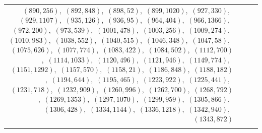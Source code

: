 \documentclass[11pt]{article}
\begin{document}
\begin{longtable}{@{}rrl>{\raggedright\arraybackslash}p{}@{}}
$(890,256)$,\allowbreak\ $(892,848)$,\allowbreak\ $(898,52)$,\allowbreak\ $(899,1020)$,\allowbreak\ $(927,330)$,\allowbreak\ $(929,1107)$,\allowbreak\ $(935,126)$,\allowbreak\ $(936,95)$,\allowbreak\ $(964,404)$,\allowbreak\ $(966,1366)$,\allowbreak\ $(972,200)$,\allowbreak\ $(973,539)$,\allowbreak\ $(1001,478)$,\allowbreak\ $(1003,256)$,\allowbreak\ $(1009,274)$,\allowbreak\ $(1010,983)$,\allowbreak\ $(1038,552)$,\allowbreak\ $(1040,515)$,\allowbreak\ $(1046,348)$,\allowbreak\ $(1047,58)$,\allowbreak\ $(1075,626)$,\allowbreak\ $(1077,774)$,\allowbreak\ $(1083,422)$,\allowbreak\ $(1084,502)$,\allowbreak\ $(1112,700)$,\allowbreak\ $(1114,1033)$,\allowbreak\ $(1120,496)$,\allowbreak\ $(1121,946)$,\allowbreak\ $(1149,774)$,\allowbreak\ $(1151,1292)$,\allowbreak\ $(1157,570)$,\allowbreak\ $(1158,21)$,\allowbreak\ $(1186,848)$,\allowbreak\ $(1188,182)$,\allowbreak\ $(1194,644)$,\allowbreak\ $(1195,465)$,\allowbreak\ $(1223,922)$,\allowbreak\ $(1225,441)$,\allowbreak\ $(1231,718)$,\allowbreak\ $(1232,909)$,\allowbreak\ $(1260,996)$,\allowbreak\ $(1262,700)$,\allowbreak\ $(1268,792)$,\allowbreak\ $(1269,1353)$,\allowbreak\ $(1297,1070)$,\allowbreak\ $(1299,959)$,\allowbreak\ $(1305,866)$,\allowbreak\ $(1306,428)$,\allowbreak\ $(1334,1144)$,\allowbreak\ $(1336,1218)$,\allowbreak\ $(1342,940)$,\allowbreak\ $(1343,872)$\\
\addlinespace[3pt]
\end{longtable}
\endgroup
\end{document}
